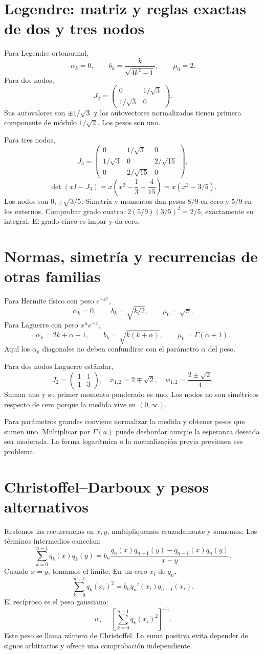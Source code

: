 \documentclass[11pt,a4paper]{article}
\theoremstyle{definition}
\newcounter{problema}
\begin{document}
\section{Legendre: matriz y reglas exactas de dos y tres nodos}
Para Legendre ortonormal,
\[
\alpha_k=0,\qquad b_k=\frac{k}{\sqrt{4k^2-1}},\qquad \mu_0=2.
\]
Para dos nodos,
\[
J_2=\begin{pmatrix}0&1/\sqrt3\\1/\sqrt3&0\end{pmatrix}.
\]
Sus autovalores son $\pm1/\sqrt3$ y los autovectores normalizados tienen primera componente de módulo $1/\sqrt2$. Los pesos son uno.

Para tres nodos,
\[
J_3=\begin{pmatrix}
0&1/\sqrt3&0\\
1/\sqrt3&0&2/\sqrt{15}\\
0&2/\sqrt{15}&0
\end{pmatrix},
\]
\[
\det(xI-J_3)=x\left(x^2-\frac13-\frac4{15}\right)
=x(x^2-3/5).
\]
Los nodos son $0,\pm\sqrt{3/5}$. Simetría y momentos dan pesos $8/9$ en cero y $5/9$ en los externos. Comprobar grado cuatro:
$2(5/9)(3/5)^2=2/5$, exactamente su integral. El grado cinco es impar y da cero.

\section{Normas, simetría y recurrencias de otras familias}
Para Hermite físico con peso $e^{-x^2}$,
\[
\alpha_k=0,\qquad b_k=\sqrt{k/2},\qquad \mu_0=\sqrt\pi.
\]
Para Laguerre con peso $x^\alpha e^{-x}$,
\[
\alpha_k=2k+\alpha+1,\qquad
b_k=\sqrt{k(k+\alpha)},\qquad \mu_0=\Gamma(\alpha+1).
\]
Aquí los $\alpha_k$ diagonales no deben confundirse con el parámetro $\alpha$ del peso.

Para dos nodos Laguerre estándar,
\[
J_2=\begin{pmatrix}1&1\\1&3\end{pmatrix},
\quad x_{1,2}=2\mp\sqrt2,
\quad w_{1,2}=\frac{2\pm\sqrt2}{4}.
\]
Suman uno y su primer momento ponderado es uno. Los nodos no son simétricos respecto de cero porque la medida vive en $(0,\infty)$.

Para parámetros grandes conviene normalizar la medida y obtener pesos que sumen uno. Multiplicar por $\Gamma(a)$ puede desbordar aunque la esperanza deseada sea moderada. La forma logarítmica o la normalización previa previenen ese problema.

\section{Christoffel--Darboux y pesos alternativos}
Restemos las recurrencias en $x,y$, multipliquemos cruzadamente y sumemos. Los términos intermedios cancelan:
\[
\sum_{k=0}^{n-1}q_k(x)q_k(y)
=b_n\frac{q_n(x)q_{n-1}(y)-q_{n-1}(x)q_n(y)}{x-y}.
\]
Cuando $x=y$, tomamos el límite. En un cero $x_i$ de $q_n$,
\[
\sum_{k=0}^{n-1}q_k(x_i)^2
=b_nq_n'(x_i)q_{n-1}(x_i).
\]
El recíproco es el peso gaussiano:
\[
w_i=\left[\sum_{k=0}^{n-1}q_k(x_i)^2\right]^{-1}.
\]
Este peso se llama número de Christoffel. La suma positiva evita depender de signos arbitrarios y ofrece una comprobación independiente.
\end{document}
